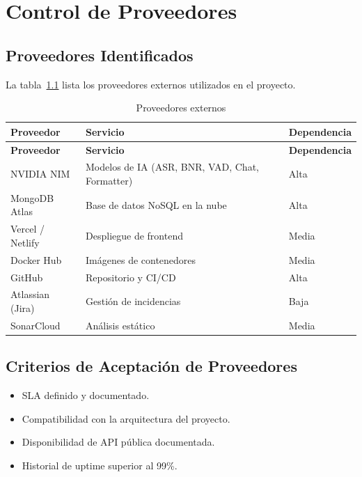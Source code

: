 \chapter{Control de Proveedores}
\label{sec:proveedores}

\section{Proveedores Identificados}
\label{sec:proveedores-identificados}

La tabla~\ref{tab:proveedores} lista los proveedores externos utilizados en el proyecto.

\begin{longtable}{lll}
\caption{Proveedores externos}
\label{tab:proveedores}\\
\toprule
\textbf{Proveedor} & \textbf{Servicio} & \textbf{Dependencia}\\
\midrule
\endfirsthead
\toprule
\textbf{Proveedor} & \textbf{Servicio} & \textbf{Dependencia}\\
\midrule
\endhead
\bottomrule
\endfoot

NVIDIA NIM & Modelos de IA (ASR, BNR, VAD, Chat, Formatter) & Alta\\

MongoDB Atlas & Base de datos NoSQL en la nube & Alta\\

Vercel / Netlify & Despliegue de frontend & Media\\

Docker Hub & Imágenes de contenedores & Media\\

GitHub & Repositorio y CI/CD & Alta\\

Atlassian (Jira) & Gestión de incidencias & Baja\\

SonarCloud & Análisis estático & Media\\

\end{longtable}

\section{Criterios de Aceptación de Proveedores}
\label{sec:criterios-proveedores}

\begin{itemize}
    \item SLA definido y documentado.
    \item Compatibilidad con la arquitectura del proyecto.
    \item Disponibilidad de API pública documentada.
    \item Historial de uptime superior al 99\%.
\end{itemize}
